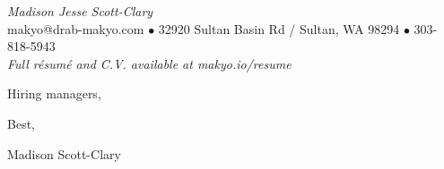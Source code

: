 \documentclass[letterpaper]{memoir}
\begin{document}
\begin{center}
  {\huge \textit{\color{titlegreydark} Madison Jesse Scott-Clary}}\\
  {\color{titlegreydark} makyo@drab-makyo.com $\bullet$ 32920 Sultan Basin Rd / Sultan, WA 98294 $\bullet$ 303-818-5943}\\
  {\small \color{titlegreylight} \textit{Full r\'esum\'e and C.V. available at makyo.io/resume}}
\end{center}

\vspace{0.5in}

\noindent Hiring managers,

\vspace{0.25in}

\noindent 

\vspace{0.25in}

Best,

\vspace{0.25in}

Madison Scott-Clary
\end{document}
